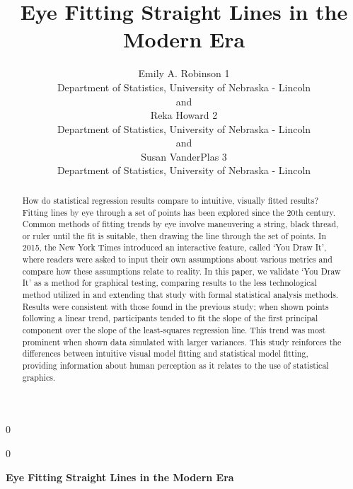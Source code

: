 \documentclass[12pt]{article}
\newcommand{\blind}{0}
\begin{document}
\def\spacingset#1{\renewcommand{\baselinestretch}%
{#1}\small\normalsize} \spacingset{1}



\blind
{
  \title{\bf Eye Fitting Straight Lines in the Modern Era}

  \author{
        Emily A. Robinson 1 \\
    Department of Statistics, University of Nebraska - Lincoln\\
     and \\     Reka Howard 2 \\
    Department of Statistics, University of Nebraska - Lincoln\\
     and \\     Susan VanderPlas 3 \\
    Department of Statistics, University of Nebraska - Lincoln\\
      }
  \maketitle
} \fi

\blind
{
  \bigskip
  \bigskip
  \bigskip
  \begin{center}
    {\LARGE\bf Eye Fitting Straight Lines in the Modern Era}
  \end{center}
  \medskip
} \fi

\bigskip
\begin{abstract}
How do statistical regression results compare to intuitive, visually
fitted results? Fitting lines by eye through a set of points has been
explored since the 20th century. Common methods of fitting trends by eye
involve maneuvering a string, black thread, or ruler until the fit is
suitable, then drawing the line through the set of points. In 2015, the
New York Times introduced an interactive feature, called `You Draw It',
where readers were asked to input their own assumptions about various
metrics and compare how these assumptions relate to reality. In this
paper, we validate `You Draw It' as a method for graphical testing,
comparing results to the less technological method utilized in
\citet{mosteller1981eye} and extending that study with formal
statistical analysis methods. Results were consistent with those found
in the previous study; when shown points following a linear trend,
participants tended to fit the slope of the first principal component
over the slope of the least-squares regression line. This trend was most
prominent when shown data simulated with larger variances. This study
reinforces the differences between intuitive visual model fitting and
statistical model fitting, providing information about human perception
as it relates to the use of statistical graphics.
\end{abstract}
\end{document}

